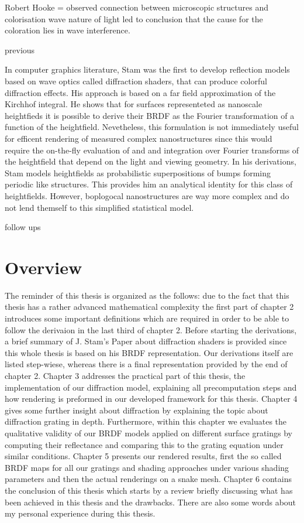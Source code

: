 Robert Hooke = observed connection between microscopic structures and colorisation
wave nature of light led to conclusion that the cause for the coloration lies in wave interference.

previous

In computer graphics literature, Stam was the first to develop reflection models based on wave optics called diffraction shaders, that can produce colorful diffraction effects. His approach is based on a far field approximation of the Kirchhof integral. He shows that for surfaces representeted as nanoscale heightfieds it is possible to derive their BRDF as the Fourier transformation of a function of the heightfield. Nevetheless, this formulation is not immediately useful for efficent rendering of measured complex nanostructures since this would require the on-the-fly evaluation of and and integration over Fourier transforms of the heightfield that depend on the light and viewing geometry. In his derivations, Stam models heightfields as probabilistic superpositions of bumps forming periodic like structures. This provides him an analytical identity for this class of heightfields. However, boplogocal nanostructures are way more complex and do not lend themself to this simplified statistical model.

follow ups


\section{Overview}
The reminder of this thesis is organized as the follows: due to the fact that this thesis has a rather advanced mathematical complexity the first part of chapter 2 introduces some important definitions which are required in order to be able to follow the derivaion in the last third of chapter 2. Before starting the derivations, a brief summary of J. Stam's Paper about diffraction shaders is provided since this whole thesis is based on his BRDF representation. Our derivations itself are listed step-wiese, whereas there is a final representation provided by the end of chapter 2. Chapter 3 addresses the practical part of this thesis, the implementation of our diffraction model, explaining all precomputation steps and how rendering is preformed in our developed framework for this thesis. Chapter 4  gives some further insight about diffraction by explaining the topic about diffraction grating in depth. Furthermore, within this chapter we evaluates the qualitative validity of our BRDF models applied on different surface gratings by computing their reflectance and comparing this to the grating equation under similar conditions. Chapter 5 presents our rendered results, first the so called BRDF maps for all our gratings and shading approaches under various shading parameters and then the actual renderings on a snake mesh. Chapter 6 contains the conclusion of this thesis which starts by a review briefly discussing what has been achieved in this thesis and the drawbacks. There are also some words about my personal experience during this thesis.
